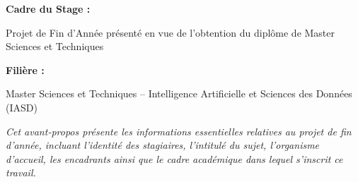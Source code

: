 \begin{center}
\large
\textbf{Cadre du Stage :}
\end{center}
\begin{center}
Projet de Fin d'Année présenté en vue de l'obtention du diplôme de
Master Sciences et Techniques
\end{center}


\begin{center}
\large
\textbf{Filière :}
\end{center}
\begin{center}
Master Sciences et Techniques
 -- Intelligence Artificielle et Sciences des Données (IASD)
\end{center}

\vspace{0.5cm}

\begin{center}
\small
\textit{Cet avant-propos présente les informations essentielles relatives au projet de fin d'année, incluant l'identité des stagiaires, l'intitulé du sujet, l'organisme d'accueil, les encadrants ainsi que le cadre académique dans lequel s'inscrit ce travail.}
\end{center}

